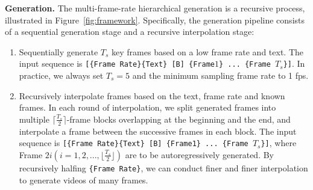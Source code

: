 \textbf{Generation.} The multi-frame-rate hierarchical generation is a recursive process, illustrated in Figure~\ref{fig:framework}. Specifically, the generation pipeline consists of a sequential generation stage and a recursive interpolation stage:
\begin{enumerate}[(1)]
\item Sequentially generate $T_{s}$ key frames based on a low frame rate and text. The input sequence is \texttt{[\{Frame Rate\}\{Text\} [B] \{Frame$1$\} ...  \{Frame $T_s$\}]}. In practice, we always set $T_{s}=5$ and the minimum sampling frame rate to 1 fps. 

\item Recursively interpolate frames based on the text, frame rate and known frames. In each round of interpolation, we split generated frames into multiple $\lceil \frac{T_s}{2} \rceil$-frame blocks overlapping at the beginning and the end, and interpolate a frame between the successive frames in each block. The input sequence is \texttt{[\{Frame Rate\}\{Text\} [B] \{Frame1\} ... \{Frame $T_s$\}]}, where Frame $2i (i=1,2,...,\lfloor \frac{T_s}{2} \rfloor)$ are to be autoregressively generated. By recursively halfing \texttt{\{Frame Rate\}}, we can conduct finer and finer interpolation to generate videos of many frames.  
\end{enumerate}

